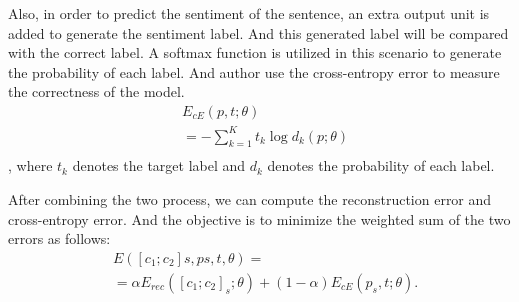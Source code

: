 \documentclass[dvips,9pt]{article}
\begin{document}
Also, in order to predict the sentiment of the sentence, an extra output unit is added to generate the sentiment label. And this generated label will be compared with the correct label. A softmax function is utilized in this scenario to generate the probability of each label. And author use the cross-entropy error to measure the correctness of the model.
\begin{equation}
\begin{split}
 & E_{cE}(p,t;\theta) \\
 & = -\sum_{k=1}^{K}{t_{k}\log{}d_{k}(p;\theta)}\\
 \end{split}
\end{equation}
, where $t_{k}$ denotes the target label and $d_{k}$ denotes the probability of each label.

After combining the two process, we can compute the reconstruction error and cross-entropy error. And the objective is to minimize the weighted sum of the two errors as follows:
\begin{equation}
\begin{split}
 & E([c_{1}; c_{2}]s, ps, t, θ) = \\
 & = \alpha E_{rec}([c_{1}; c_{2}]_{s}; \theta) + (1 - \alpha)E_{cE}(p_{s}, t; \theta).
\\
 \end{split}
\end{equation}
\end{document}
